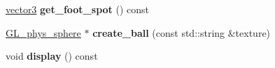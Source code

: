 \begin{DoxyCompactItemize}
\item 
\hypertarget{class_table_aa0ee07897221b62ba004148bee99b5c9}{
\hyperlink{classvector3d}{vector3} {\bfseries get\_\-foot\_\-spot} () const }
\label{class_table_aa0ee07897221b62ba004148bee99b5c9}

\item 
\hypertarget{class_table_a6cd0ede2c0aa29cd5278d8b5be4c4e8a}{
\hyperlink{class_g_l__phys__sphere}{GL\_\-phys\_\-sphere} $\ast$ {\bfseries create\_\-ball} (const std::string \&texture)}
\label{class_table_a6cd0ede2c0aa29cd5278d8b5be4c4e8a}

\item 
\hypertarget{class_table_a13e4ca52cdbd5094a2ced393ecdcfa02}{
void {\bfseries display} () const }
\label{class_table_a13e4ca52cdbd5094a2ced393ecdcfa02}

\end{DoxyCompactItemize}
